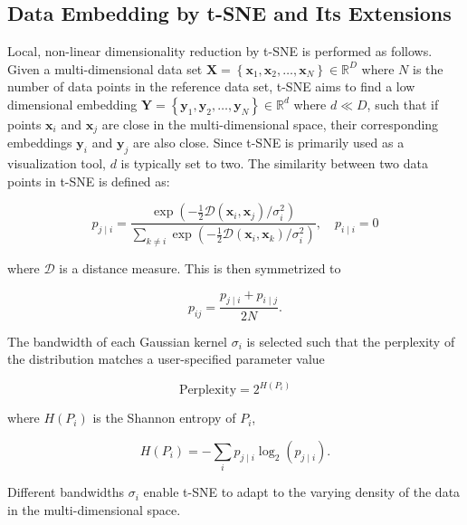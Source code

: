 \documentclass[runningheads]{llncs}
\begin{document}
\subsection{Data Embedding by t-SNE and Its Extensions\label{sec:tsne}}

Local, non-linear dimensionality reduction by t-SNE is performed as follows.
Given a multi-dimensional data set $\mathbf{X} = \left \{ \mathbf{x}_1,
\mathbf{x}_2, \dots, \mathbf{x}_N \right \} \in \mathbb{R}^D$ where $N$ is the
number of data points in the reference data set, t-SNE aims to find a low
dimensional embedding $\mathbf{Y} = \left \{ \mathbf{y}_1, \mathbf{y}_2, \dots,
\mathbf{y}_N \right \} \in \mathbb{R}^d$ where $d \ll D$, such that if points
$\mathbf{x}_i$ and $\mathbf{x}_j$ are close in the multi-dimensional space,
their corresponding embeddings $\mathbf{y}_i$ and $\mathbf{y}_j$ are also
close. Since t-SNE is primarily used as a visualization tool, $d$ is typically
set to two. The similarity between two data points in t-SNE is defined as:

\begin{equation}
p_{j \mid i} = \frac{\exp \left ( -\frac{1}{2} \mathcal{D}(\mathbf{x}_i, \mathbf{x}_j ) / \sigma_i^2 \right )}{\sum_{k \neq i } \exp \left ( -\frac{1}{2} \mathcal{D}(\mathbf{x}_i, \mathbf{x}_k ) / \sigma_i^2 \right )}, \quad p_{i \mid i} = 0
\label{eq:gaussian_kernel}
\end{equation}

\noindent where $\mathcal{D}$ is a distance measure. This is then symmetrized to

\begin{equation}
p_{ij} = \frac{p_{j \mid i} + p_{i \mid j}}{2N}.
\label{eq:symmetrize}
\end{equation}

The bandwidth of each Gaussian kernel $\sigma_i$ is selected such that the
perplexity of the distribution matches a user-specified parameter value

\begin{equation}
\text{Perplexity} = 2^{H(P_i)}
\end{equation}

\noindent where $H(P_i)$ is the Shannon entropy of $P_i$,

\begin{equation}
H(P_i) = -\sum_i p_{j \mid i} \log_2 (p_{j \mid i}).
\end{equation}

\noindent Different bandwidths $\sigma_i$ enable t-SNE to adapt to the varying
density of the data in the multi-dimensional space.
\end{document}
